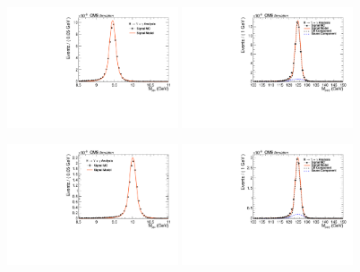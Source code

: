 \begin{figure}[!htbp]
\begin{center}


\includegraphics[width=0.45\textwidth]{figures/fitPlotFiles2D/HToUpsilonPhotonSignalAndBackgroundFit/mMuMNU_HToUpsilon1SPhotonSignalAndBackgroundFit_Signal_Cat0}\hspace*{1.cm}
\includegraphics[width=0.45\textwidth]{figures/fitPlotFiles2D/HToUpsilonPhotonSignalAndBackgroundFit/mHZ_HToUpsilon1SPhotonSignalAndBackgroundFit_Signal_Cat0_default}\hspace*{1.cm}

\includegraphics[width=0.45\textwidth]{figures/fitPlotFiles2D/HToUpsilonPhotonSignalAndBackgroundFit/mMuMNU_HToUpsilon2SPhotonSignalAndBackgroundFit_Signal_Cat0}\hspace*{1.cm}
\includegraphics[width=0.45\textwidth]{figures/fitPlotFiles2D/HToUpsilonPhotonSignalAndBackgroundFit/mHZ_HToUpsilon2SPhotonSignalAndBackgroundFit_Signal_Cat0_default}\hspace*{1.cm}


\end{center}
\end{figure}
